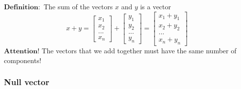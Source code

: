 \documentclass[11pt]{article}
\begin{document}
    $\mathbf{Definition:}$ The sum of the vectors $x$ and $y$ is a vector
$$$$
$$
 x + y = \begin{bmatrix}x_1 \\ x_2 \\ ... \\ x_n\end{bmatrix} + 
         \begin{bmatrix}y_1 \\ y_2 \\ ... \\ y_n\end{bmatrix} = 
         \begin{bmatrix} x_1 + y_1 \\ x_2 + y_2 \\ ... \\ x_n + y_n \end{bmatrix}
$$
$$$$
$\mathbf{Attention!}$ The vectors that we add together must have the same number of components!

    
    \hypertarget{null-vector}{%
\subsubsection{Null vector}\label{null-vector}}
\end{document}
